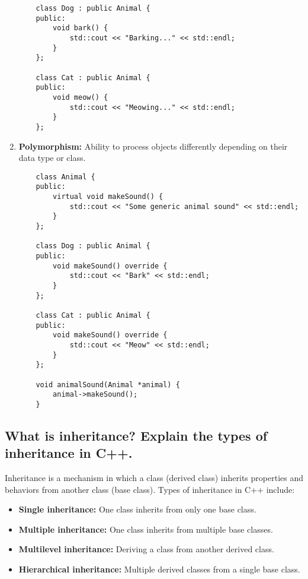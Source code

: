 \begin{enumerate}
\begin{tcolorbox}[title=Example of Inheritance]
\begin{verbatim}
    class Dog : public Animal {
    public:
        void bark() {
            std::cout << "Barking..." << std::endl;
        }
    };
    
    class Cat : public Animal {
    public:
        void meow() {
            std::cout << "Meowing..." << std::endl;
        }
    };
    \end{verbatim}
    \end{tcolorbox}
    \item \textbf{Polymorphism:} Ability to process objects differently depending on their data type or class.
    \begin{tcolorbox}[title=Example of Polymorphism]
    \begin{verbatim}
    class Animal {
    public:
        virtual void makeSound() {
            std::cout << "Some generic animal sound" << std::endl;
        }
    };
    
    class Dog : public Animal {
    public:
        void makeSound() override {
            std::cout << "Bark" << std::endl;
        }
    };
    
    class Cat : public Animal {
    public:
        void makeSound() override {
            std::cout << "Meow" << std::endl;
        }
    };
    
    void animalSound(Animal *animal) {
        animal->makeSound();
    }
    \end{verbatim}
    \end{tcolorbox}
\end{enumerate}

\subsection{What is inheritance? Explain the types of inheritance in C++.}
Inheritance is a mechanism in which a class (derived class) inherits properties and behaviors from another class (base class). Types of inheritance in C++ include:
\begin{itemize}
    \item \textbf{Single inheritance:} One class inherits from only one base class.
    \item \textbf{Multiple inheritance:} One class inherits from multiple base classes.
    \item \textbf{Multilevel inheritance:} Deriving a class from another derived class.
    \item \textbf{Hierarchical inheritance:} Multiple derived classes from a single base class.
\end{itemize}

